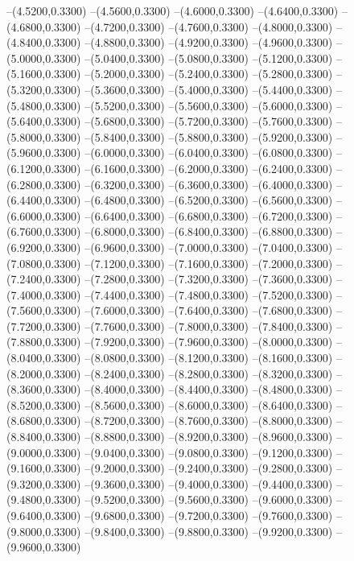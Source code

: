 {	--(4.5200,0.3300)
	--(4.5600,0.3300)
	--(4.6000,0.3300)
	--(4.6400,0.3300)
	--(4.6800,0.3300)
	--(4.7200,0.3300)
	--(4.7600,0.3300)
	--(4.8000,0.3300)
	--(4.8400,0.3300)
	--(4.8800,0.3300)
	--(4.9200,0.3300)
	--(4.9600,0.3300)
	--(5.0000,0.3300)
	--(5.0400,0.3300)
	--(5.0800,0.3300)
	--(5.1200,0.3300)
	--(5.1600,0.3300)
	--(5.2000,0.3300)
	--(5.2400,0.3300)
	--(5.2800,0.3300)
	--(5.3200,0.3300)
	--(5.3600,0.3300)
	--(5.4000,0.3300)
	--(5.4400,0.3300)
	--(5.4800,0.3300)
	--(5.5200,0.3300)
	--(5.5600,0.3300)
	--(5.6000,0.3300)
	--(5.6400,0.3300)
	--(5.6800,0.3300)
	--(5.7200,0.3300)
	--(5.7600,0.3300)
	--(5.8000,0.3300)
	--(5.8400,0.3300)
	--(5.8800,0.3300)
	--(5.9200,0.3300)
	--(5.9600,0.3300)
	--(6.0000,0.3300)
	--(6.0400,0.3300)
	--(6.0800,0.3300)
	--(6.1200,0.3300)
	--(6.1600,0.3300)
	--(6.2000,0.3300)
	--(6.2400,0.3300)
	--(6.2800,0.3300)
	--(6.3200,0.3300)
	--(6.3600,0.3300)
	--(6.4000,0.3300)
	--(6.4400,0.3300)
	--(6.4800,0.3300)
	--(6.5200,0.3300)
	--(6.5600,0.3300)
	--(6.6000,0.3300)
	--(6.6400,0.3300)
	--(6.6800,0.3300)
	--(6.7200,0.3300)
	--(6.7600,0.3300)
	--(6.8000,0.3300)
	--(6.8400,0.3300)
	--(6.8800,0.3300)
	--(6.9200,0.3300)
	--(6.9600,0.3300)
	--(7.0000,0.3300)
	--(7.0400,0.3300)
	--(7.0800,0.3300)
	--(7.1200,0.3300)
	--(7.1600,0.3300)
	--(7.2000,0.3300)
	--(7.2400,0.3300)
	--(7.2800,0.3300)
	--(7.3200,0.3300)
	--(7.3600,0.3300)
	--(7.4000,0.3300)
	--(7.4400,0.3300)
	--(7.4800,0.3300)
	--(7.5200,0.3300)
	--(7.5600,0.3300)
	--(7.6000,0.3300)
	--(7.6400,0.3300)
	--(7.6800,0.3300)
	--(7.7200,0.3300)
	--(7.7600,0.3300)
	--(7.8000,0.3300)
	--(7.8400,0.3300)
	--(7.8800,0.3300)
	--(7.9200,0.3300)
	--(7.9600,0.3300)
	--(8.0000,0.3300)
	--(8.0400,0.3300)
	--(8.0800,0.3300)
	--(8.1200,0.3300)
	--(8.1600,0.3300)
	--(8.2000,0.3300)
	--(8.2400,0.3300)
	--(8.2800,0.3300)
	--(8.3200,0.3300)
	--(8.3600,0.3300)
	--(8.4000,0.3300)
	--(8.4400,0.3300)
	--(8.4800,0.3300)
	--(8.5200,0.3300)
	--(8.5600,0.3300)
	--(8.6000,0.3300)
	--(8.6400,0.3300)
	--(8.6800,0.3300)
	--(8.7200,0.3300)
	--(8.7600,0.3300)
	--(8.8000,0.3300)
	--(8.8400,0.3300)
	--(8.8800,0.3300)
	--(8.9200,0.3300)
	--(8.9600,0.3300)
	--(9.0000,0.3300)
	--(9.0400,0.3300)
	--(9.0800,0.3300)
	--(9.1200,0.3300)
	--(9.1600,0.3300)
	--(9.2000,0.3300)
	--(9.2400,0.3300)
	--(9.2800,0.3300)
	--(9.3200,0.3300)
	--(9.3600,0.3300)
	--(9.4000,0.3300)
	--(9.4400,0.3300)
	--(9.4800,0.3300)
	--(9.5200,0.3300)
	--(9.5600,0.3300)
	--(9.6000,0.3300)
	--(9.6400,0.3300)
	--(9.6800,0.3300)
	--(9.7200,0.3300)
	--(9.7600,0.3300)
	--(9.8000,0.3300)
	--(9.8400,0.3300)
	--(9.8800,0.3300)
	--(9.9200,0.3300)
	--(9.9600,0.3300)
}
